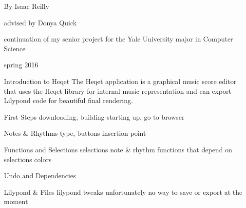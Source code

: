 \documentclass{article}
\begin{document}
\pagestyle{empty}
\begin{center}
\vspace{3cm}

\vspace{2cm}
{\Large By Isaac Reilly}

\vspace{0.15cm}
{\large advised by Donya Quick}

\vspace{0.1cm}
{continuation of my senior project for the Yale University major in Computer Science}

\vspace{13cm}

{\small spring 2016}

\end{center}

\pagebreak

\tableofcontents
\newpage
\pagestyle{plain}

\begin{section}{Introduction to Heqet}
The Heqet application is a graphical music score editor that uses the Heqet library for internal music representation and can export Lilypond code for beautiful final rendering. 
\end{section}

\begin{section}{First Steps}
downloading, building
starting up, go to browser
\end{section}

\begin{section}{Notes \& Rhythms}
type, buttons
insertion point
\end{section}

\begin{section}{Functions and Selections}
selections
note \& rhythm functions that depend on selections
colors
\end{section}


\begin{section}{Undo and Dependencies}

\end{section}


\begin{section}{Lilypond \& Files}
lilypond tweaks
unfortunately no way to save or export at the moment

\end{section}
\end{document}
